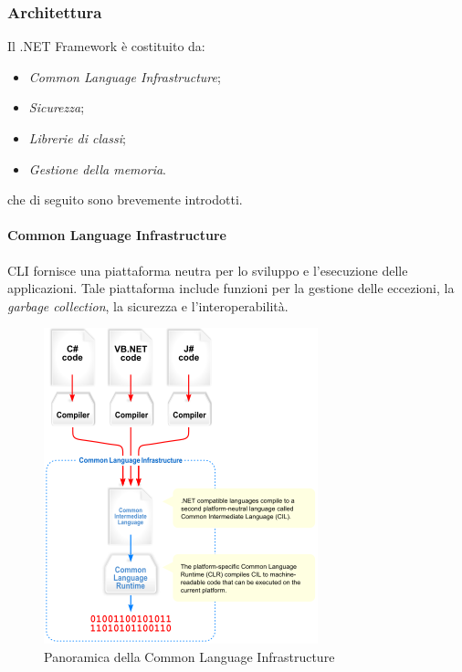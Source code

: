 \subsubsection{Architettura}
Il .NET Framework è costituito da:
\begin{itemize}
\item \emph{Common Language Infrastructure};
\item \emph{Sicurezza};
\item \emph{Librerie di classi};
\item \emph{Gestione della memoria}.
\end{itemize}
che di seguito sono brevemente introdotti.
\paragraph{Common Language Infrastructure}
CLI fornisce una piattaforma neutra per lo sviluppo e l'esecuzione delle applicazioni. Tale piattaforma include funzioni per la gestione delle eccezioni, la \emph{garbage collection}, la sicurezza e l'interoperabilità.
\begin{figure}
\begin{center}
\includegraphics[scale=0.4]{imgs/commonlanguageinfrastructure.png} 
\caption{Panoramica della Common Language Infrastructure\label{commonlanguageinfrastructure}}
\end{center}
\end{figure}

